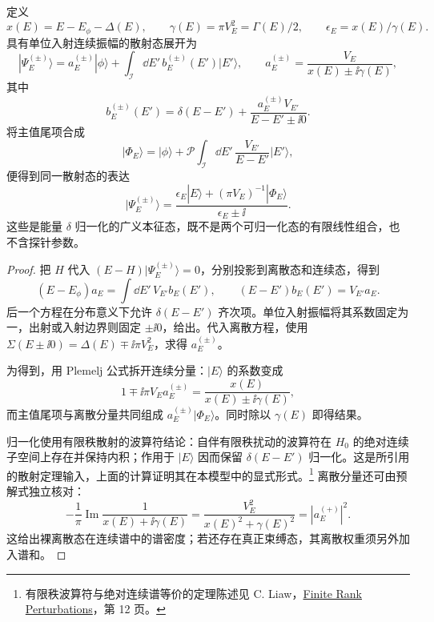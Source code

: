 \begin{proposition}[单离散态与连续谱的散射态]
定义
\[
 x(E)=E-E_\phi-\Delta(E),\qquad
 \gamma(E)=\pi V_E^2=\Gamma(E)/2,\qquad
 \epsilon_E=x(E)/\gamma(E).
\]
具有单位入射连续振幅的散射态展开为
\begin{equation}
 |\Psi_E^{(\pm)}\rangle
 =a_E^{(\pm)}|\phi\rangle
 +\int_{\mathcal I}\dd E'\,b_E^{(\pm)}(E')|E'\rangle,
 \qquad a_E^{(\pm)}=\frac{V_E}{x(E)\pm\ii\gamma(E)},
 \label{eq:fano-state-expansion}
\end{equation}
其中
\begin{equation}
 b_E^{(\pm)}(E')
 =\delta(E-E')+
 \frac{a_E^{(\pm)}V_{E'}}{E-E'\pm\ii0}.
 \label{eq:fano-distribution-solution}
\end{equation}
将主值尾项合成
\[
 |\Phi_E\rangle=|\phi\rangle+
 \mathcal P\int_{\mathcal I}\dd E'\,\frac{V_{E'}}{E-E'}|E'\rangle,
\]
便得到同一散射态的表达
\begin{equation}
 |\Psi_E^{(\pm)}\rangle
 =\frac{\epsilon_E|E\rangle+(\pi V_E)^{-1}|\Phi_E\rangle}
        {\epsilon_E\pm\ii}.
 \label{eq:fano-normalized-state}
\end{equation}
这些是能量 $\delta$ 归一化的广义本征态，既不是两个可归一化态的有限线性组合，也不含探针参数。
\end{proposition}
\begin{proof}
把 $H$ 代入 $(E-H)|\Psi_E^{(\pm)}\rangle=0$，分别投影到离散态和连续态，得到
\[
 (E-E_\phi)a_E=\int\dd E'\,V_{E'}b_E(E'),
 \qquad (E-E')b_E(E')=V_{E'}a_E.
\]
后一个方程在分布意义下允许 $\delta(E-E')$ 齐次项。单位入射振幅将其系数固定为一，出射或入射边界则固定 $\pm\ii0$，给出。代入离散方程，使用
$\Sigma(E\pm\ii0)=\Delta(E)\mp\ii\pi V_E^2$，求得 $a_E^{(\pm)}$。

为得到，用 Plemelj 公式拆开连续分量：$|E\rangle$ 的系数变成
\[
 1\mp\ii\pi V_Ea_E^{(\pm)}
 =\frac{x(E)}{x(E)\pm\ii\gamma(E)},
\]
而主值尾项与离散分量共同组成 $a_E^{(\pm)}|\Phi_E\rangle$。同时除以 $\gamma(E)$ 即得结果。

归一化使用有限秩散射的波算符结论：自伴有限秩扰动的波算符在 $H_0$ 的绝对连续子空间上存在并保持内积；作用于 $|E\rangle$ 因而保留 $\delta(E-E')$ 归一化。这是所引用的散射定理输入，上面的计算证明其在本模型中的显式形式。\footnote{有限秩波算符与绝对连续谱等价的定理陈述见 C. Liaw，\href{https://www.math.stonybrook.edu/~dimitriosnt/caft2018/slides/Liaw.pdf}{Finite Rank Perturbations}，第 12 页。}
离散分量还可由预解式独立核对：
\[
 -\frac1\pi\operatorname{Im}\frac1{x(E)+\ii\gamma(E)}
 =\frac{V_E^2}{x(E)^2+\gamma(E)^2}
 =|a_E^{(+)}|^2.
\]
这给出裸离散态在连续谱中的谱密度；若还存在真正束缚态，其离散权重须另外加入谱和。
\end{proof}

